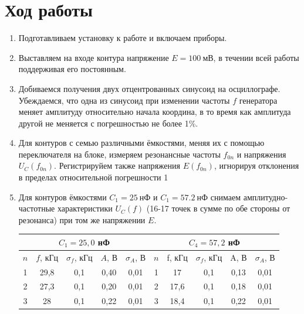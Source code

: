 \documentclass[a4paper,12pt]{article}
\begin{document}
\section*{Ход работы}
\begin{enumerate}
\item Подготавливаем установку к работе и включаем приборы.
\item Выставляем на входе контура напряжение $E = 100~\text{мВ}$, в течении всей работы поддерживая его постоянным.
\item Добиваемся получения двух отцентрованных синусоид на осциллографе. Убеждаемся, что одна из синусоид при изменении частоты $f$ генератора меняет амплитуду относительно начала координа, в то время как амплитуда другой не меняется с погрешностью не более 1\%.
\item Для контуров с семью различными ёмкостями, меняя их с помощью переключателя на
блоке, измеряем резонансные частоты $f_{0n}$ и напряжения $U_C(f_{0n})$. Регистрируйем также
напряжения $E(f_{0n})$, игнорируя отклонения в пределах относительной погрешности 1%
\item Для контуров ёмкостями $C_1 = 25~\text{нФ}$ и $C_1 = 57.2~\text{нФ}$ снимаем амплитудно-частотные характеристики $U_C(f)$ (16-17 точек
в сумме по обе стороны от резонанса) при том же напряжении $E$.
\begin{table}[h]
\centering
\begin{tabular}{ccccc||c|c|c|c|c|}
\hline
\multicolumn{5}{|c||}{$C_1 = 25,0$ нФ}                                                                                                         & \multicolumn{5}{c|}{$C_4 = 57,2$ нФ}        \\ \hline
\multicolumn{1}{|c|}{$n$} & \multicolumn{1}{c|}{$f$, кГц} & \multicolumn{1}{c|}{$\sigma_f$, кГц} & \multicolumn{1}{c|}{$A$, В} & $\sigma_A$, В         & $n$ & f, кГц & $\sigma_f$, кГц & A, В & $\sigma_A$, В \\ \hline
\multicolumn{1}{|c|}{1}   & \multicolumn{1}{c|}{29,8}     & \multicolumn{1}{c|}{0,1}             & \multicolumn{1}{c|}{0,40}   & 0,01                  & 1   & 17     & 0,1             & 0,13 & 0,01          \\ \hline
\multicolumn{1}{|c|}{2}   & \multicolumn{1}{c|}{27,3}     & \multicolumn{1}{c|}{0,1}             & \multicolumn{1}{c|}{0,20}   & 0,01                  & 2   & 17,6   & 0,1             & 0,18 & 0,01          \\ \hline
\multicolumn{1}{|c|}{3}   & \multicolumn{1}{c|}{28}       & \multicolumn{1}{c|}{0,1}             & \multicolumn{1}{c|}{0,22}   & 0,01                  & 3   & 18,4   & 0,1             & 0,22 & 0,01          \\ \hline

\end{tabular}
\end{table}
\end{enumerate}
\end{document}
